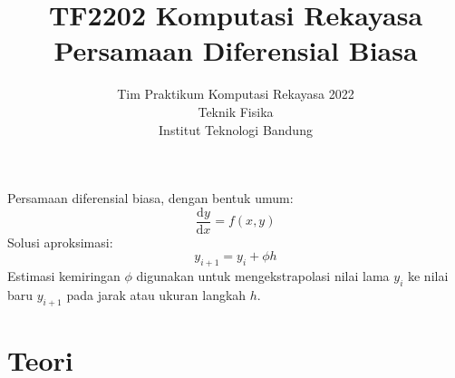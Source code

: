 



\title{%
{\small TF2202 Komputasi Rekayasa}\\
Persamaan Diferensial Biasa
}
\author{Tim Praktikum Komputasi Rekayasa 2022\\
Teknik Fisika\\
Institut Teknologi Bandung}
\date{}
\maketitle

Persamaan diferensial biasa, dengan bentuk umum:
\begin{equation*}
\frac{\mathrm{d}y}{\mathrm{d}x} = f(x,y)
\end{equation*}
Solusi aproksimasi:
\begin{equation*}
y_{i+1} = y_{i} + \phi h
\end{equation*}
Estimasi kemiringan $\phi$ digunakan untuk mengekstrapolasi nilai lama
$y_{i}$ ke nilai baru $y_{i+1}$ pada jarak atau ukuran langkah $h$.











\section*{Teori}




